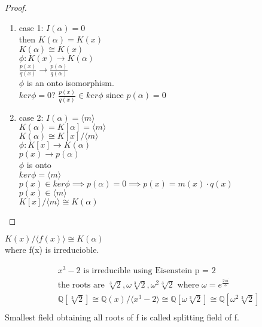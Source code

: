 \documentclass{article}
\begin{document}
\begin{proof}
\begin{enumerate}
    \item case 1: $I(\alpha) = 0$ \\ 
            then $K(\alpha) = K(x)$ \\
            $K(\alpha) \cong K(x)$ \\
            $\phi: K(x) \to K(\alpha)$ \\
            $\frac{p(x)}{q(x)} \to \frac{p(\alpha)}{q(\alpha)}$ \\
            $\phi$ is an onto isomorphism.\\ 
            $ker \phi = 0$? $\frac{p(x)}{q(x)} \in ker \phi$ since $p(\alpha) = 0$\\
    \item case 2: $I(\alpha) = \langle m \rangle$ \\
            $K(\alpha) = K[\alpha] = \langle m \rangle$ \\
            $K(\alpha) \cong K[x] / \langle m \rangle$ \\
            $\phi: K[x] \to K(\alpha)$ \\
            $p(x) \to p(\alpha)$ \\
            $\phi$ is onto \\
            $ker \phi = \langle m \rangle$ \\
            $p(x) \in ker \phi \implies p(\alpha) = 0 \implies p(x) = m(x) \cdot q(x)$ \\
            $p(x) \in \langle m \rangle$ \\
            $K[x] / \langle m \rangle \cong K(\alpha)$ 
\end{enumerate}
\end{proof}
$K(x) / \langle f(x) \rangle \cong K(\alpha)$ \\ where f(x) is irreducioble. 

\begin{align*}
    &x^3 - 2 \text{ is irreducible using Eisenstein p = 2}  \\
    &\text{the roots are } \sqrt[3]{2}, \omega \sqrt[3]{2}, \omega^2 \sqrt[3]{2} \text{ where } \omega = e^{\frac{2\pi i}{3}} \\ 
    &\mathbb{Q}[\sqrt[3]{2}] \cong \mathbb{Q}(x) / \langle x^3 - 2 \rangle \cong \mathbb{Q}[\omega \sqrt[3]{2}] \cong \mathbb{Q}[\omega^2 \sqrt[3]{2}] \\
\end{align*}
Smallest field obtaining all roots of f is called splitting field of f. 
\end{document}
